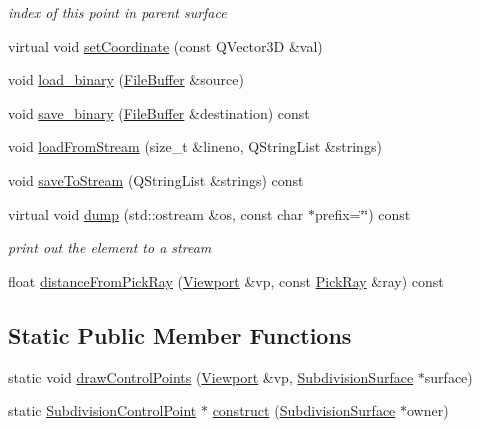 \begin{DoxyCompactItemize}
\begin{DoxyCompactList}\small\item\em index of this point in parent surface \end{DoxyCompactList}\item 
virtual void \hyperlink{classShipCAD_1_1SubdivisionControlPoint_a54a5233e02ef34a174c24d5dcf3c6407}{set\+Coordinate} (const Q\+Vector3D \&val)
\item 
void \hyperlink{classShipCAD_1_1SubdivisionControlPoint_a989c801ca1c836ca73f77c68d719f546}{load\+\_\+binary} (\hyperlink{classShipCAD_1_1FileBuffer}{File\+Buffer} \&source)
\item 
void \hyperlink{classShipCAD_1_1SubdivisionControlPoint_a5ccb62a954fe0d8afa3231d9810f7590}{save\+\_\+binary} (\hyperlink{classShipCAD_1_1FileBuffer}{File\+Buffer} \&destination) const 
\item 
void \hyperlink{classShipCAD_1_1SubdivisionControlPoint_aba97c3c0d7ebfcd98458931645ffacd0}{load\+From\+Stream} (size\+\_\+t \&lineno, Q\+String\+List \&strings)
\item 
void \hyperlink{classShipCAD_1_1SubdivisionControlPoint_aa1f6b5f50785ab39145dd7ee09dc8e29}{save\+To\+Stream} (Q\+String\+List \&strings) const 
\item 
virtual void \hyperlink{classShipCAD_1_1SubdivisionControlPoint_a4a9d6e45291c27f19f0d76c9b9d19048}{dump} (std\+::ostream \&os, const char $\ast$prefix=\char`\"{}\char`\"{}) const 
\begin{DoxyCompactList}\small\item\em print out the element to a stream \end{DoxyCompactList}\item 
float \hyperlink{classShipCAD_1_1SubdivisionControlPoint_af6148a12f92a65efe935e70394c1a4ca}{distance\+From\+Pick\+Ray} (\hyperlink{classShipCAD_1_1Viewport}{Viewport} \&vp, const \hyperlink{structShipCAD_1_1PickRay}{Pick\+Ray} \&ray) const 
\end{DoxyCompactItemize}
\subsection*{Static Public Member Functions}
\begin{DoxyCompactItemize}
\item 
static void \hyperlink{classShipCAD_1_1SubdivisionControlPoint_a761599371138b34be2c7a2cac3699e2c}{draw\+Control\+Points} (\hyperlink{classShipCAD_1_1Viewport}{Viewport} \&vp, \hyperlink{classShipCAD_1_1SubdivisionSurface}{Subdivision\+Surface} $\ast$surface)
\item 
static \hyperlink{classShipCAD_1_1SubdivisionControlPoint}{Subdivision\+Control\+Point} $\ast$ \hyperlink{classShipCAD_1_1SubdivisionControlPoint_adc189f3e5cff85ecd1a59356e0f7d63d}{construct} (\hyperlink{classShipCAD_1_1SubdivisionSurface}{Subdivision\+Surface} $\ast$owner)
\end{DoxyCompactItemize}
